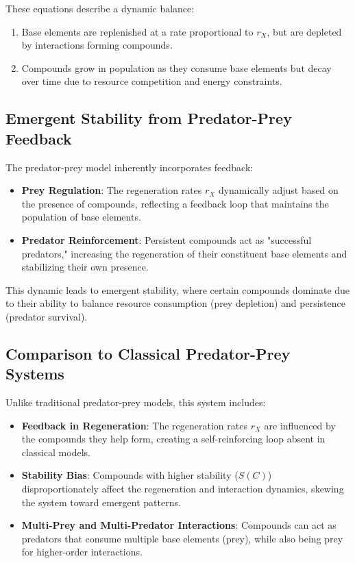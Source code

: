 \documentclass[entropy,article,submit,pdftex,moreauthors]{Definitions/mdpi}
\begin{document}
These equations describe a dynamic balance:
\begin{enumerate}
    \item Base elements are replenished at a rate proportional to \( r_X \), but are depleted by interactions forming compounds.
    \item Compounds grow in population as they consume base elements but decay over time due to resource competition and energy constraints.
\end{enumerate}

\subsection{Emergent Stability from Predator-Prey Feedback}

The predator-prey model inherently incorporates feedback:
\begin{itemize}
    \item \textbf{Prey Regulation}: The regeneration rates \( r_X \) dynamically adjust based on the presence of compounds, reflecting a feedback loop that maintains the population of base elements.
    \item \textbf{Predator Reinforcement}: Persistent compounds act as "successful predators," increasing the regeneration of their constituent base elements and stabilizing their own presence.
\end{itemize}

This dynamic leads to emergent stability, where certain compounds dominate due to their ability to balance resource consumption (prey depletion) and persistence (predator survival).

\subsection{Comparison to Classical Predator-Prey Systems}

Unlike traditional predator-prey models, this system includes:
\begin{itemize}
    \item \textbf{Feedback in Regeneration}: The regeneration rates \( r_X \) are influenced by the compounds they help form, creating a self-reinforcing loop absent in classical models.
    \item \textbf{Stability Bias}: Compounds with higher stability (\( S(C) \)) disproportionately affect the regeneration and interaction dynamics, skewing the system toward emergent patterns.
    \item \textbf{Multi-Prey and Multi-Predator Interactions}: Compounds can act as predators that consume multiple base elements (prey), while also being prey for higher-order interactions.
\end{itemize}
\end{document}
